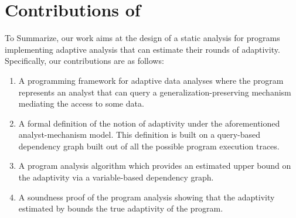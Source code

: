 \section{Contributions of {\ADAPTSYSTEM}}
\label{sec:adapt-contributions}
To Summarize, our work aims at the design of a static analysis for programs implementing adaptive analysis that can estimate their rounds of adaptivity. Specifically, our contributions are as follows:
\begin{enumerate}
    \item A programming framework for adaptive data analyses where the program represents an analyst that can query a generalization-preserving mechanism mediating the access to some data. 
    \item A formal definition of the notion of adaptivity under the aforementioned analyst-mechanism model. This definition is built on a query-based dependency graph built out of all the possible program execution traces.
    \item A program analysis algorithm {\ADAPTSYSTEM} which provides an estimated upper bound on the adaptivity via a variable-based dependency graph.
    \item A soundness proof of the program analysis showing that the adaptivity estimated by {\ADAPTSYSTEM} bounds the true adaptivity of the program. 
\end{enumerate}



